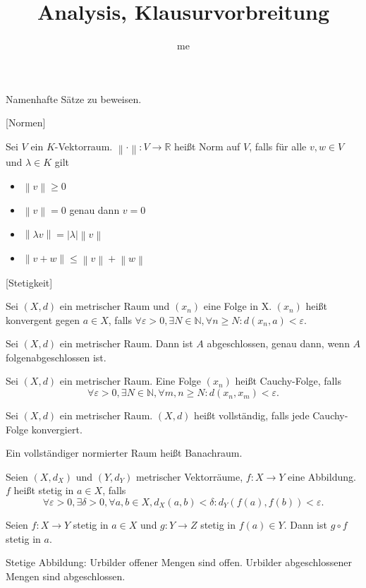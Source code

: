 \documentclass[fleqn,draft,a5paper]{article}
\title{Analysis, Klausurvorbreitung}
\author{me}
\providecommand{\abs}[1]{\left\lvert#1\right\rvert}
\providecommand{\norm}[1]{\left\lVert#1\right\rVert}
\theoremstyle{remark}
\begin{document}
\maketitle
\newpage

Namenhafte Sätze zu beweisen.

[Normen]

Sei \(V\) ein \(K\)-Vektorraum.  \(\norm{\cdot}\colon V \to \mathbb{R}\) heißt Norm auf
\(V\), falls für alle \(v, w \in V\) und \(\lambda \in K\) gilt

\begin{itemize}
\item \(\norm{v} \ge 0\)
\item \(\norm{v} = 0\) genau dann \(v = 0\)
\item \(\norm{\lambda v} = \abs{\lambda} \norm{v}\)
\item \(\norm{v+w} \le \norm{v} + \norm{w}\)
\end{itemize}

[Stetigkeit]

Sei \((X, d)\) ein metrischer Raum und \((x_{n})\) eine Folge in X.
\((x_{n})\) heißt konvergent gegen \(a \in X\), falls
\(\forall \varepsilon > 0, \exists N \in \mathbb{N}, \forall n \ge N\colon d(x_{n}, a) < \varepsilon\).

Sei \((X, d)\) ein metrischer Raum.  Dann ist \(A\) abgeschlossen,
genau dann, wenn \(A\) folgenabgeschlossen ist.

Sei \((X, d)\) ein metrischer Raum.  Eine Folge \((x_{n})\) heißt
Cauchy-Folge, falls
\[\forall \varepsilon > 0, \exists N \in \mathbb{N}, \forall m, n \ge N\colon d(x_{n}, x_{m}) < \varepsilon.\]

Sei \((X, d)\) ein metrischer Raum.  \((X, d)\) heißt vollständig,
falls jede Cauchy-Folge konvergiert.

Ein vollständiger normierter Raum heißt Banachraum.

Seien \((X, d_{X})\) und \((Y, d_{Y})\) metrischer Vektorräume, \(f\colon X \to Y\)
eine Abbildung.  \(f\) heißt stetig in \(a \in X\), falls
\[\forall \varepsilon > 0, \exists \delta > 0, \forall a, b \in X, d_{X}(a, b) < \delta\colon
  d_{Y}(f(a),f(b))< \varepsilon.\]

Seien \(f\colon X \to Y\) stetig in \(a \in X\) und \(g\colon Y \to Z\) stetig in
\(f(a) \in Y\).  Dann ist \(g \circ f\) stetig in \(a\).

Stetige Abbildung: Urbilder offener Mengen sind offen.  Urbilder
abgeschlossener Mengen sind abgeschlossen.
\end{document}
